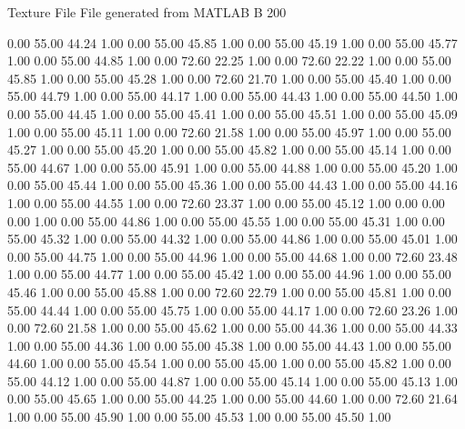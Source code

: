 Texture File
File generated from MATLAB
B 200

   0.00   55.00   44.24   1.00
   0.00   55.00   45.85   1.00
   0.00   55.00   45.19   1.00
   0.00   55.00   45.77   1.00
   0.00   55.00   44.85   1.00
   0.00   72.60   22.25   1.00
   0.00   72.60   22.22   1.00
   0.00   55.00   45.85   1.00
   0.00   55.00   45.28   1.00
   0.00   72.60   21.70   1.00
   0.00   55.00   45.40   1.00
   0.00   55.00   44.79   1.00
   0.00   55.00   44.17   1.00
   0.00   55.00   44.43   1.00
   0.00   55.00   44.50   1.00
   0.00   55.00   44.45   1.00
   0.00   55.00   45.41   1.00
   0.00   55.00   45.51   1.00
   0.00   55.00   45.09   1.00
   0.00   55.00   45.11   1.00
   0.00   72.60   21.58   1.00
   0.00   55.00   45.97   1.00
   0.00   55.00   45.27   1.00
   0.00   55.00   45.20   1.00
   0.00   55.00   45.82   1.00
   0.00   55.00   45.14   1.00
   0.00   55.00   44.67   1.00
   0.00   55.00   45.91   1.00
   0.00   55.00   44.88   1.00
   0.00   55.00   45.20   1.00
   0.00   55.00   45.44   1.00
   0.00   55.00   45.36   1.00
   0.00   55.00   44.43   1.00
   0.00   55.00   44.16   1.00
   0.00   55.00   44.55   1.00
   0.00   72.60   23.37   1.00
   0.00   55.00   45.12   1.00
   0.00   0.00   0.00   1.00
   0.00   55.00   44.86   1.00
   0.00   55.00   45.55   1.00
   0.00   55.00   45.31   1.00
   0.00   55.00   45.32   1.00
   0.00   55.00   44.32   1.00
   0.00   55.00   44.86   1.00
   0.00   55.00   45.01   1.00
   0.00   55.00   44.75   1.00
   0.00   55.00   44.96   1.00
   0.00   55.00   44.68   1.00
   0.00   72.60   23.48   1.00
   0.00   55.00   44.77   1.00
   0.00   55.00   45.42   1.00
   0.00   55.00   44.96   1.00
   0.00   55.00   45.46   1.00
   0.00   55.00   45.88   1.00
   0.00   72.60   22.79   1.00
   0.00   55.00   45.81   1.00
   0.00   55.00   44.44   1.00
   0.00   55.00   45.75   1.00
   0.00   55.00   44.17   1.00
   0.00   72.60   23.26   1.00
   0.00   72.60   21.58   1.00
   0.00   55.00   45.62   1.00
   0.00   55.00   44.36   1.00
   0.00   55.00   44.33   1.00
   0.00   55.00   44.36   1.00
   0.00   55.00   45.38   1.00
   0.00   55.00   44.43   1.00
   0.00   55.00   44.60   1.00
   0.00   55.00   45.54   1.00
   0.00   55.00   45.00   1.00
   0.00   55.00   45.82   1.00
   0.00   55.00   44.12   1.00
   0.00   55.00   44.87   1.00
   0.00   55.00   45.14   1.00
   0.00   55.00   45.13   1.00
   0.00   55.00   45.65   1.00
   0.00   55.00   44.25   1.00
   0.00   55.00   44.60   1.00
   0.00   72.60   21.64   1.00
   0.00   55.00   45.90   1.00
   0.00   55.00   45.53   1.00
   0.00   55.00   45.50   1.00
